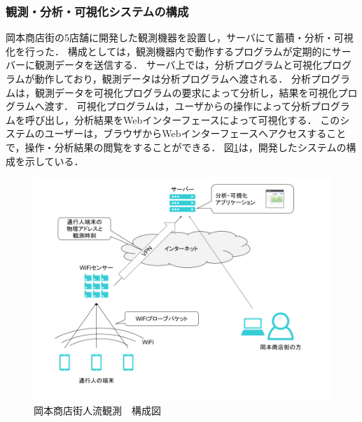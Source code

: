 \subsubsection{観測・分析・可視化システムの構成}
岡本商店街の5店舗に開発した観測機器を設置し，サーバにて蓄積・分析・可視化を行った．
構成としては，観測機器内で動作するプログラムが定期的にサーバーに観測データを送信する．
サーバ上では，分析プログラムと可視化プログラムが動作しており，観測データは分析プログラムへ渡される．
分析プログラムは，観測データを可視化プログラムの要求によって分析し，結果を可視化プログラムへ渡す．
可視化プログラムは，ユーザからの操作によって分析プログラムを呼び出し，分析結果をWebインターフェースによって可視化する．
このシステムのユーザーは，ブラウザからWebインターフェースへアクセスすることで，操作・分析結果の閲覧をすることができる．
図\ref{fig:okamoto_diag1}は，開発したシステムの構成を示している．
\begin{figure}[htbp]
\includegraphics[width=16cm]{images/okamoto_diag1.png}
\caption{岡本商店街人流観測　構成図}
\label{fig:okamoto_diag1}
\end{figure}


